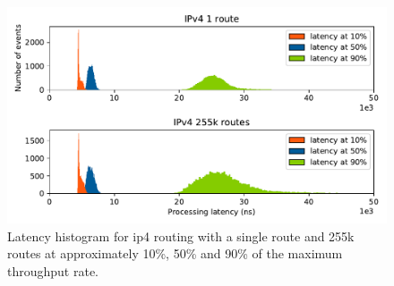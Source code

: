 




\begin{figure}[!ht]
\noindent\hspace{0.5mm}\includegraphics[width=\linewidth]{pics/latency_histogram_overview_ip4.pdf}
\caption{Latency histogram for \Ac{ip4} routing with a single route and 255k routes at approximately 10\%, 50\% and 90\% of the maximum throughput rate. }
\label{graph:latencyhistogram}
\end{figure}



